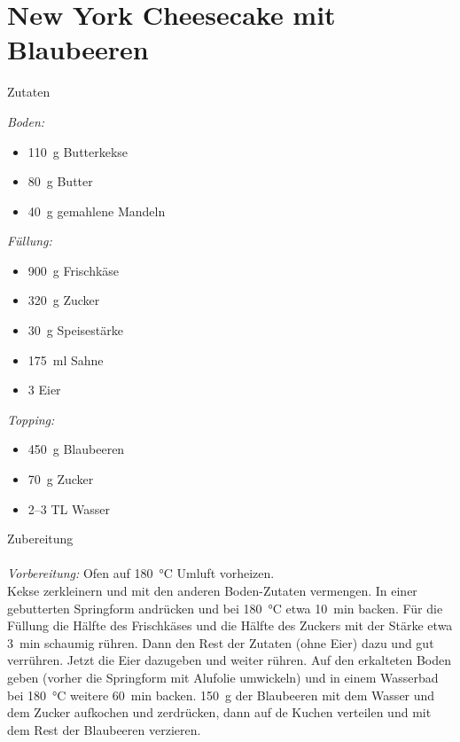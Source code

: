\section*{New York Cheesecake mit Blaubeeren}
\ihead{}\ohead{}
\cfoot{}
{\Large Zutaten}
\begin{multicols}{2}
\textit{Boden:}
\begin{itemize}
    \item \SI{110}{g} Butterkekse
    \item \SI{80}{g} Butter
    \item \SI{40}{g} gemahlene Mandeln
\end{itemize}
\textit{Füllung:}
\begin{itemize}
    \item \SI{900}{g} Frischkäse
    \item \SI{320}{g} Zucker
    \item \SI{30}{g} Speisestärke
    \item \SI{175}{ml} Sahne    
    \item \num{3} Eier
\end{itemize}
\textit{Topping:}
\begin{itemize}
    \item \SI{450}{g} Blaubeeren
    \item \SI{70}{g} Zucker
    \item \numrange{2}{3} TL Wasser
\end{itemize}
\end{multicols}
\noindent
{\Large Zubereitung}\\
\\
\textit{Vorbereitung:} Ofen auf \SI{180}{\celsius} Umluft vorheizen.\\
Kekse zerkleinern und mit den anderen Boden-Zutaten vermengen. 
In einer gebutterten Springform andrücken und bei \SI{180}{\celsius} etwa \SI{10}{min} backen.
Für die Füllung die Hälfte des Frischkäses und die Hälfte des Zuckers mit der Stärke etwa \SI{3}{min} schaumig rühren.
Dann den Rest der Zutaten (ohne Eier) dazu und gut verrühren. 
Jetzt die Eier dazugeben und weiter rühren.
Auf den erkalteten Boden geben (vorher die Springform mit Alufolie umwickeln) und in einem Wasserbad bei \SI{180}{\celsius} weitere \SI{60}{min} backen.
\SI{150}{g} der Blaubeeren mit dem Wasser und dem Zucker aufkochen und zerdrücken, dann auf de Kuchen verteilen und mit dem Rest der Blaubeeren verzieren. 
